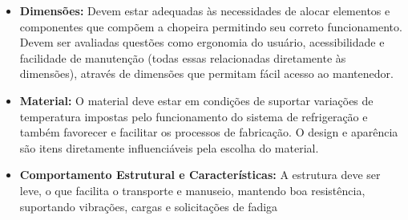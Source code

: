 		\begin{itemize}
			\item \textbf{Dimensões:} Devem estar adequadas às necessidades de alocar elementos e componentes que compõem a chopeira permitindo seu 	correto funcionamento. Devem ser avaliadas questões como ergonomia do usuário, acessibilidade e facilidade de manutenção (todas essas relacionadas diretamente às dimensões), através de dimensões que permitam fácil acesso ao mantenedor.

			\item \textbf{Material:} O material deve estar em condições de suportar variações de temperatura impostas pelo funcionamento do sistema de refrigeração e também favorecer e facilitar os processos de fabricação. O design e aparência são itens diretamente influenciáveis pela escolha do material.
			
			\item \textbf{Comportamento Estrutural e Características:} A estrutura deve ser leve, o que facilita o transporte e manuseio, mantendo boa resistência, suportando vibrações, cargas e solicitações de fadiga

		\end{itemize}



